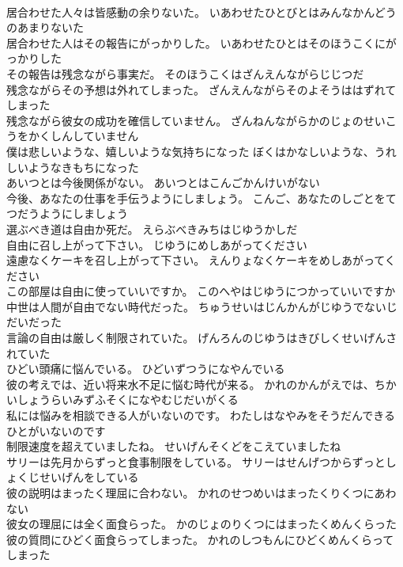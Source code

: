 \documentclass[8pt]{extreport}
\begin{document}
\begin{CJK}{UTF8}{min}
\\	居合わせた人々は皆感動の余りないた。	いあわせたひとびとはみんなかんどうのあまりないた 
\\	居合わせた人はその報告にがっかりした。	いあわせたひとはそのほうこくにがっかりした 
\\	その報告は残念ながら事実だ。	そのほうこくはざんえんながらじじつだ 
\\	残念ながらその予想は外れてしまった。	ざんえんながらそのよそうははずれてしまった 
\\	残念ながら彼女の成功を確信していません。	ざんねんながらかのじょのせいこうをかくしんしていません 
\\	僕は悲しいような、嬉しいような気持ちになった	ぼくはかなしいような、うれしいようなきもちになった 
\\	あいつとは今後関係がない。	あいつとはこんごかんけいがない 
\\	今後、あなたの仕事を手伝うようにしましょう。	こんご、あなたのしごとをてつだうようにしましょう 
\\	選ぶべき道は自由か死だ。	えらぶべきみちはじゆうかしだ 
\\	自由に召し上がって下さい。	じゆうにめしあがってください 
\\	遠慮なくケーキを召し上がって下さい。	えんりょなくケーキをめしあがってください 
\\	この部屋は自由に使っていいですか。	このへやはじゆうにつかっていいですか 
\\	中世は人間が自由でない時代だった。	ちゅうせいはじんかんがじゆうでないじだいだった 
\\	言論の自由は厳しく制限されていた。	げんろんのじゆうはきびしくせいげんされていた 
\\	ひどい頭痛に悩んでいる。	ひどいずつうになやんでいる 
\\	彼の考えでは、近い将来水不足に悩む時代が来る。	かれのかんがえでは、ちかいしょうらいみずふそくになやむじだいがくる 
\\	私には悩みを相談できる人がいないのです。	わたしはなやみをそうだんできるひとがいないのです 
\\	制限速度を超えていましたね。	せいげんそくどをこえていましたね 
\\	サリーは先月からずっと食事制限をしている。	サリーはせんげつからずっとしょくじせいげんをしている 
\\	彼の説明はまったく理屈に合わない。	かれのせつめいはまったくりくつにあわない 
\\	彼女の理屈には全く面食らった。	かのじょのりくつにはまったくめんくらった 
\\	彼の質問にひどく面食らってしまった。	かれのしつもんにひどくめんくらってしまった 

\end{CJK}
\end{document}
